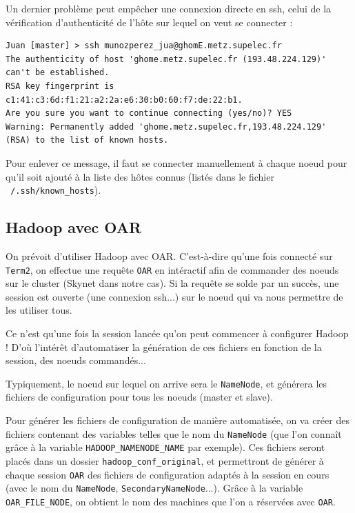 \par Un dernier problème peut empêcher une connexion directe en ssh, celui de la vérification d'authenticité de l'hôte sur lequel on veut se connecter : 
\begin{verbatim}
Juan [master] > ssh munozperez_jua@ghomE.metz.supelec.fr
The authenticity of host 'ghome.metz.supelec.fr (193.48.224.129)' 
can't be established.
RSA key fingerprint is c1:41:c3:6d:f1:21:a2:2a:e6:30:b0:60:f7:de:22:b1.
Are you sure you want to continue connecting (yes/no)? YES
Warning: Permanently added 'ghome.metz.supelec.fr,193.48.224.129' 
(RSA) to the list of known hosts.
\end{verbatim}

\par Pour enlever ce message, il faut se connecter manuellement à chaque noeud pour qu'il soit ajouté à la liste des hôtes connus (listés dans le fichier \texttt{~/.ssh/known\_hosts}).

\subsection{Hadoop avec OAR}
\label{sec:hadoop-avec-oar}

\par On prévoit d'utiliser Hadoop avec OAR. C'est-à-dire qu'une fois connecté sur \texttt{Term2}, on effectue une requête \texttt{OAR} en intéractif afin de commander des noeuds sur le cluster (Skynet dans notre cas). Si la requête se solde par un succès, une session est ouverte (une connexion ssh...) sur le noeud qui va nous permettre de les utiliser tous.

\par Ce n'est qu'une fois la session lancée qu'on peut commencer à configurer Hadoop ! D'où l'intérêt d'automatiser la génération de ces fichiers en fonction de la session, des noeuds commandés... 
\par Typiquement, le noeud sur lequel on arrive sera le \texttt{NameNode}, et générera les fichiers de configuration pour tous les noeuds (master et slave).

\par Pour générer les fichiers de configuration de manière automatisée, on va créer des fichiers contenant des variables telles que le nom du \texttt{NameNode} (que l'on connaît grâce à la variable \texttt{HADOOP\_NAMENODE\_NAME} par exemple). Ces fichiers seront placés dans un dossier \texttt{hadoop\_conf\_original}, et permettront de générer à chaque session \texttt{OAR} des fichiers de configuration adaptés à la session en cours (avec le nom du \texttt{NameNode}, \texttt{SecondaryNameNode}...). Grâce à la variable \texttt{OAR\_FILE\_NODE}, on obtient le nom des machines que l'on a réservées avec \texttt{OAR}.

